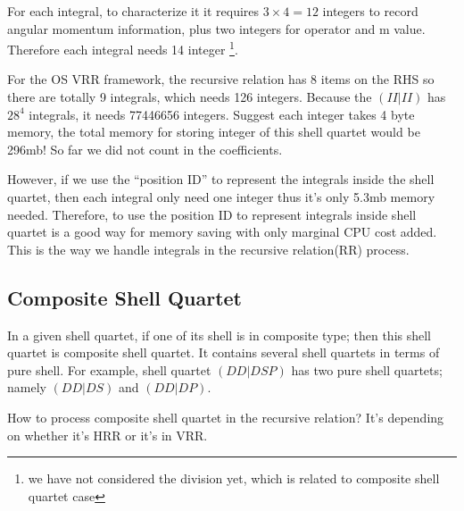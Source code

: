 For each integral, to characterize it it requires $3\times 4 = 12$
integers to record angular momentum information, plus two integers
for operator and m value. Therefore each integral needs 14 integer
\footnote{we have not considered the division yet, which is related to
composite shell quartet case}.

For the OS VRR framework, the recursive relation has 8 items on the 
RHS so there are totally 9 integrals, which needs 126 integers. 
Because the $(II|II)$ has $28^4$ integrals, it needs 77446656 integers.
Suggest each integer takes 4 byte memory, the total memory for 
storing integer of this shell quartet would be 296mb! So far we did not
count in the coefficients.

However, if we use the ``position ID'' to represent the integrals 
inside the shell quartet, then each integral only need one integer 
thus it's only 5.3mb memory needed. Therefore, to use the position 
ID to represent integrals inside shell quartet is a good way for 
memory saving with only marginal CPU cost added. This is the way
we handle integrals in the recursive relation(RR) process.

\subsection{Composite Shell Quartet}
%
%
\label{composite_shell_quartet}

In a given shell quartet, if one of its shell is in composite type; 
then this shell quartet is composite shell quartet. It contains
several shell quartets in terms of pure shell. For example,
shell quartet $(DD|DSP)$ has two pure shell quartets; namely 
$(DD|DS)$ and $(DD|DP)$.

How to process composite shell quartet in the recursive relation?
It's depending on whether it's HRR or it's in VRR.

